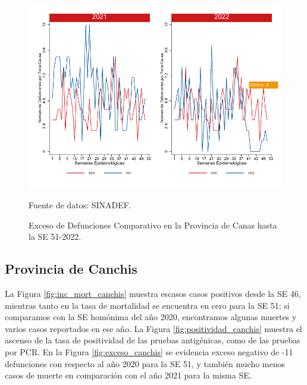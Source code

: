 \documentclass[12pt,a4paper,openany]{book}
\begin{document}
	\begin{figure}[h]
		\caption{Exceso de Defunciones Comparativo en la Provincia de Canas hasta la SE 51-2022.}\label{fig:exceso_canas}
		\begin{center}
			\includegraphics[width=0.7\linewidth]{../figuras/exceso_4.pdf}
		\end{center}
		{\footnotesize {Fuente de datos: SINADEF.}}
	\end{figure}
	
	\clearpage
	
	\subsection*{Provincia de Canchis}
	\noindent La Figura \ref{fig:inc_mort_canchis} muestra escasos casos positivos desde la SE 46, mientras tanto en la tasa de mortalidad se encuentra en cero para la SE 51; si comparamos con la SE homónima del año 2020, encontramos algunas muertes y varios casos reportados en ese año.
	\noindent La Figura \ref{fig:positividad_canchis} muestra el ascenso de la tasa de positividad de las pruebas antigénicas, como de las pruebas por PCR. 
	En la Figura \ref{fig:exceso_canchis} se evidencia exceso negativo de -11 defunciones con respecto al año 2020 para la SE 51, y también mucho menos casos de muerte en comparación con el año 2021 para la misma SE.
	
\end{document}
